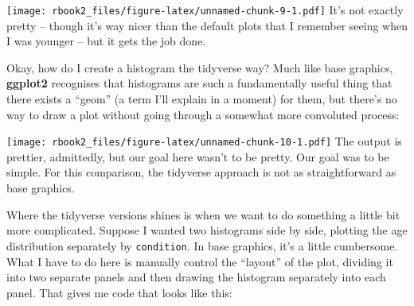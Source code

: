 \documentclass[]{book}
\newenvironment{Shaded}{\begin{snugshade}}{\end{snugshade}}
\newcommand{\DataTypeTok}[1]{\textcolor[rgb]{0.13,0.29,0.53}{#1}}
\newcommand{\DecValTok}[1]{\textcolor[rgb]{0.00,0.00,0.81}{#1}}
\newcommand{\KeywordTok}[1]{\textcolor[rgb]{0.13,0.29,0.53}{\textbf{#1}}}
\newcommand{\NormalTok}[1]{#1}
\newcommand{\OperatorTok}[1]{\textcolor[rgb]{0.81,0.36,0.00}{\textbf{#1}}}
\newcommand{\StringTok}[1]{\textcolor[rgb]{0.31,0.60,0.02}{#1}}
\begin{document}
\texttt{[image: rbook2\_files/figure-latex/unnamed-chunk-9-1.pdf]}
It's not exactly pretty -- though it's way nicer than the default plots that I remember seeing when I was younger -- but it gets the job done.

Okay, how do I create a histogram the tidyverse way? Much like base graphics, \textbf{ggplot2} recognises that histograms are such a fundamentally useful thing that there exists a ``geom'' (a term I'll explain in a moment) for them, but there's no way to draw a plot without going through a somewhat more convoluted process:

\begin{Shaded}
\end{Shaded}

\texttt{[image: rbook2\_files/figure-latex/unnamed-chunk-10-1.pdf]}
The output is prettier, admittedly, but our goal here wasn't to be pretty. Our goal was to be simple. For this comparison, the tidyverse approach is not as straightforward as base graphics.

Where the tidyverse versions shines is when we want to do something a little bit more complicated. Suppose I wanted two histograms side by side, plotting the age distribution separately by \texttt{condition}. In base graphics, it's a little cumbersome. What I have to do here is manually control the ``layout'' of the plot, dividing it into two separate panels and then drawing the histogram separately into each panel. That gives me code that looks like this:

\begin{Shaded}
\end{Shaded}
\end{document}
